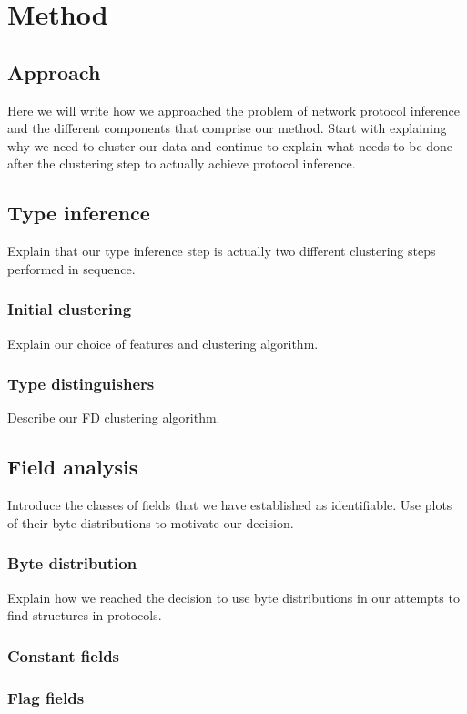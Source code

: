 \documentclass[a4paper]{report}
\begin{document}
\chapter{Method}

\section{Approach}
Here we will write how we approached the problem of network protocol inference
and the different components that comprise our method. Start with explaining
why we need to cluster our data and continue to explain what needs to be done
after the clustering step to actually achieve protocol inference.

\section{Type inference}
Explain that our type inference step is actually two different clustering steps
performed in sequence.

\subsection{Initial clustering}
Explain our choice of features and clustering algorithm.

\subsection{Type distinguishers}
Describe our FD clustering algorithm.

\section{Field analysis}
Introduce the classes of fields that we have established as identifiable. Use
plots of their byte distributions to motivate our decision.

\subsection{Byte distribution}
Explain how we reached the decision to use byte distributions in our attempts
to find structures in protocols.

\subsection{Constant fields}

\subsection{Flag fields}
\end{document}
